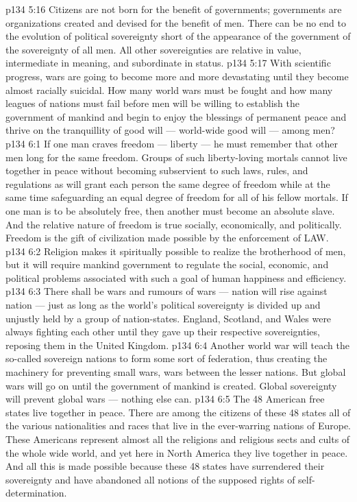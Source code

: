 \vs p134 5:16 Citizens are not born for the benefit of governments; governments are organizations created and devised for the benefit of men. There can be no end to the evolution of political sovereignty short of the appearance of the government of the sovereignty of all men. All other sovereignties are relative in value, intermediate in meaning, and subordinate in status.
\vs p134 5:17 With scientific progress, wars are going to become more and more devastating until they become almost racially suicidal. How many world wars must be fought and how many leagues of nations must fail before men will be willing to establish the government of mankind and begin to enjoy the blessings of permanent peace and thrive on the tranquillity of good will --- world\hyp{}wide good will --- among men?
\vs p134 6:1 If one man craves freedom --- liberty --- he must remember that  other men long for the same freedom. Groups of such liberty\hyp{}loving mortals cannot live together in peace without becoming subservient to such laws, rules, and regulations as will grant each person the same degree of freedom while at the same time safeguarding an equal degree of freedom for all of his fellow mortals. If one man is to be absolutely free, then another must become an absolute slave. And the relative nature of freedom is true socially, economically, and politically. Freedom is the gift of civilization made possible by the enforcement of LAW.
\vs p134 6:2 Religion makes it spiritually possible to realize the brotherhood of men, but it will require mankind government to regulate the social, economic, and political problems associated with such a goal of human happiness and efficiency.
\vs p134 6:3 There shall be wars and rumours of wars --- nation will rise against nation --- just as long as the world’s political sovereignty is divided up and unjustly held by a group of nation\hyp{}states. England, Scotland, and Wales were always fighting each other until they gave up their respective sovereignties, reposing them in the United Kingdom.
\vs p134 6:4 Another world war will teach the so\hyp{}called sovereign nations to form some sort of federation, thus creating the machinery for preventing small wars, wars between the lesser nations. But global wars will go on until the government of mankind is created. Global sovereignty will prevent global wars --- nothing else can.
\vs p134 6:5 The 48 American free states live together in peace. There are among the citizens of these 48 states all of the various nationalities and races that live in the ever\hyp{}warring nations of Europe. These Americans represent almost all the religions and religious sects and cults of the whole wide world, and yet here in North America they live together in peace. And all this is made possible because these 48 states have surrendered their sovereignty and have abandoned all notions of the supposed rights of self\hyp{}determination.
